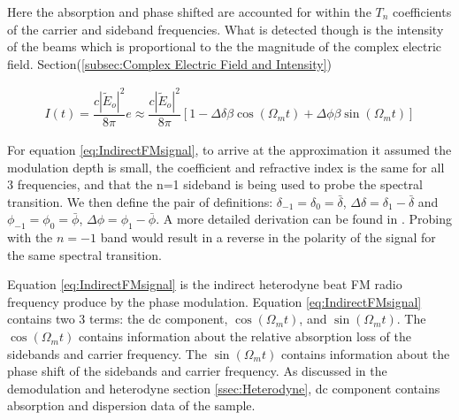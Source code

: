 \documentclass[11pt,a4paper]{book}
\begin{document}
			Here the absorption and phase shifted are accounted for within the $T_n$ coefficients of the carrier and sideband frequencies. What is detected though is the intensity of the beams which is proportional to the the magnitude of the complex electric field. Section(\autoref{subsec:Complex Electric Field and Intensity})
			
			\begin{equation}
			\label{eq:IndirectFMsignal}
			\begin{split}
			I(t) = \dfrac{c|\tilde{E}_o|^2}{8\pi} e \approx \dfrac{c|\tilde{E}_o|^2}{8\pi}[1-\Delta\delta\beta \cos{(\Omega_m t)+\Delta\phi\beta\sin{(\Omega_m t)}}]
			\end{split}
			\end{equation}
			
			For equation \autoref{eq:IndirectFMsignal}, to arrive at the approximation it assumed the modulation depth is small, the coefficient and refractive index is the same for all 3 frequencies, and that the n=1 sideband is being used to probe the spectral transition. We then define the pair of definitions: $\delta_{-1}=\delta_0=\bar{\delta}$, $\Delta\delta = \delta_1 -\bar{\delta}$ and $\phi_{-1}=\phi_0=\bar{\phi}$, $\Delta\phi = \phi_1 -\bar{\phi}$. A more detailed derivation can be found in \cite{FMspec}. Probing with the $n=-1$ band would result in a reverse in the polarity of the signal for the same spectral transition.
			
			Equation \autoref{eq:IndirectFMsignal} is the indirect heterodyne beat FM radio frequency produce by the phase modulation. Equation \autoref{eq:IndirectFMsignal} contains two 3 terms: the dc component, $\cos{(\Omega_m t)}$, and $\sin{(\Omega_m t)}$. The $\cos{(\Omega_m t)}$ contains information about the relative absorption loss of the sidebands and carrier frequency. The $\sin{(\Omega_m t)}$ contains information about the phase shift of the sidebands and carrier frequency. As discussed in the demodulation and heterodyne section \autoref{ssec:Heterodyne}, dc component contains absorption and dispersion data of the sample.
		
\end{document}
